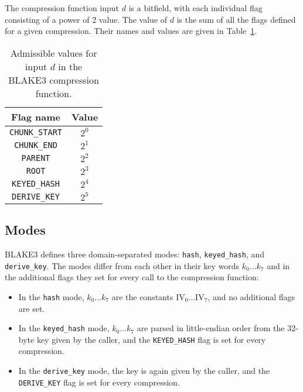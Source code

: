 \documentclass[11pt,notitlepage,a4paper]{article}
\newcommand{\IV}{\text{IV}}
\begin{document}
The compression function input $d$ is a bitfield, with each individual flag consisting of a power of 2 value. The value of $d$ is the sum of all the flags defined for a given
compression. Their names and values are given in Table~\ref{tab:flags}.
\begin{table}
  \centering
  \caption{Admissible values for input $d$ in the BLAKE3 compression function.}%
  \label{tab:flags}
  \begin{tabular}{cc}
    \toprule
    Flag name             & Value \\ \midrule
    \texttt{CHUNK\_START} & $2^0$ \\
    \texttt{CHUNK\_END}   & $2^1$ \\
    \texttt{PARENT}       & $2^2$ \\
    \texttt{ROOT}         & $2^3$ \\
    \texttt{KEYED\_HASH}  & $2^4$ \\
    \texttt{DERIVE\_KEY}  & $2^5$ \\
    \bottomrule
  \end{tabular}
\end{table}

\subsection{Modes}\label{sec:modes}

BLAKE3 defines three domain-separated modes: \texttt{hash},
\texttt{keyed\_hash}, and \texttt{derive\_key}. The modes differ from each
other in their key words $k_{0} \ldots k_{7}$ and in the additional flags they
set for every call to the compression function:

\begin{itemize}
  \item In the \texttt{hash} mode, $k_{0} \ldots k_{7}$ are the constants $\IV_0 \ldots \IV_7$, and no additional flags are set. 
  \item In the \texttt{keyed\_hash} mode, $k_{0} \ldots k_{7}$ are parsed in little-endian order from the 32-byte key given by the caller, and the \texttt{KEYED\_HASH} flag is set for every compression.
  \item  In the \texttt{derive\_key} mode, the key is again given by the caller, and the \texttt{DERIVE\_KEY} flag is set for every compression.
\end{itemize}
\end{document}
